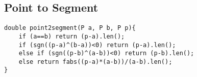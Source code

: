 \subsection{Point to Segment}
\begin{lstlisting}
double point2segment(P a, P b, P p){
    if (a==b) return (p-a).len();
    if (sgn((p-a)^(b-a))<0) return (p-a).len();
    else if (sgn((p-b)^(a-b))<0) return (p-b).len();
    else return fabs((p-a)*(a-b))/(a-b).len();
}
\end{lstlisting}
